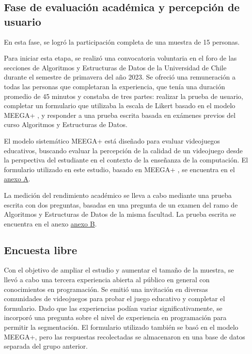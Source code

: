 \subsection{Fase de evaluación académica y percepción de usuario}

En esta fase, se logró la participación completa de una muestra de 15 personas.

Para iniciar esta etapa, se realizó una convocatoria voluntaria en el foro de las secciones de Algoritmos y Estructuras de Datos de la Universidad de Chile durante el semestre de primavera del año 2023. Se ofreció una remuneración a todas las personas que completaran la experiencia, que tenía una duración promedio de 45 minutos y constaba de tres partes: realizar la prueba de usuario, completar un formulario que utilizaba la escala de Likert basado en el modelo MEEGA+ \cite{meegaplus}, y responder a una prueba escrita basada en exámenes previos del curso Algoritmos y Estructuras de Datos.

El modelo sistemático MEEGA+ \cite{meegaplus} está diseñado para evaluar videojuegos educativos, buscando evaluar la percepción de la calidad de un videojuego desde la perspectiva del estudiante en el contexto de la enseñanza de la computación. El formulario utilizado en este estudio, basado en MEEGA+ \cite{meegaplus}, se encuentra en el \hyperref[AnexoA]{anexo A}.

La medición del rendimiento académico se lleva a cabo mediante una prueba escrita con dos preguntas, basadas en una pregunta de un examen del ramo de Algoritmos y Estructuras de Datos de la misma facultad. La prueba escrita se encuentra en el anexo \hyperref[AnexoB]{anexo B}.


\subsection{Encuesta libre}


Con el objetivo de ampliar el estudio y aumentar el tamaño de la muestra, se llevó a cabo una tercera experiencia abierta al público en general con conocimientos en programación. Se emitió una invitación en diversas comunidades de videojuegos para probar el juego educativo y completar el formulario. Dado que las experiencias podían variar significativamente, se incorporó una pregunta sobre el nivel de experiencia en programación para permitir la segmentación. El formulario utilizado también se basó en el modelo MEEGA+, pero las respuestas recolectadas se almacenaron en una base de datos separada del grupo anterior.

